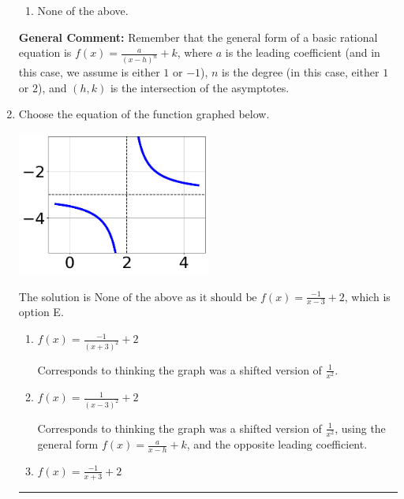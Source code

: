 \documentclass{extbook}[14pt]
\newcommand{\litem}[1]{\item #1

\rule{\textwidth}{0.4pt}}
\begin{document}
\begin{enumerate}
{\begin{enumerate}[label=\Alph*.]
\item None of the above.\end{enumerate}
\textbf{General Comment:} Remember that the general form of a basic rational equation is $ f(x) = \frac{a}{(x-h)^n} + k$, where $a$ is the leading coefficient (and in this case, we assume is either $1$ or $-1$), $n$ is the degree (in this case, either $1$ or $2$), and $(h, k)$ is the intersection of the asymptotes.
}
\litem{
Choose the equation of the function graphed below.

\begin{center}
    \includegraphics[width=0.5\textwidth]{../Figures/rationalGraphToEquationC.png}
\end{center}


The solution is \( \text{None of the above as it should be } f(x) = \frac{-1}{x - 3} + 2 \), which is option E.\begin{enumerate}[label=\Alph*.]
\item \( f(x) = \frac{-1}{(x + 3)^2} + 2 \)

Corresponds to thinking the graph was a shifted version of $\frac{1}{x^2}$.
\item \( f(x) = \frac{1}{(x - 3)^2} + 2 \)

Corresponds to thinking the graph was a shifted version of $\frac{1}{x^2}$, using the general form $f(x) = \frac{a}{x-h}+k$, and the opposite leading coefficient.
\item \( f(x) = \frac{-1}{x + 3} + 2 \)


\end{enumerate}}
\end{enumerate}
\end{document}
